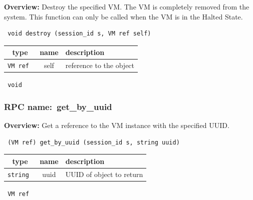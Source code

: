 {\bf Overview:} 
Destroy the specified VM.  The VM is completely removed from the system.  This function can only be called when the VM is in the Halted State.

\begin{verbatim} void destroy (session_id s, VM ref self)\end{verbatim}



 
\vspace{0.3cm}
\begin{tabular}{|c|c|p{7cm}|}
 \hline
{\bf type} & {\bf name} & {\bf description} \\ \hline
{\tt VM ref } & self & reference to the object \\ \hline 

\end{tabular}

\vspace{0.3cm}

{\tt 
void
}



\vspace{0.3cm}
\vspace{0.3cm}
\vspace{0.3cm}
\subsubsection{RPC name:~get\_by\_uuid}

{\bf Overview:} 
Get a reference to the VM instance with the specified UUID.

\begin{verbatim} (VM ref) get_by_uuid (session_id s, string uuid)\end{verbatim}



 
\vspace{0.3cm}
\begin{tabular}{|c|c|p{7cm}|}
 \hline
{\bf type} & {\bf name} & {\bf description} \\ \hline
{\tt string } & uuid & UUID of object to return \\ \hline 

\end{tabular}

\vspace{0.3cm}

{\tt 
VM ref
}



